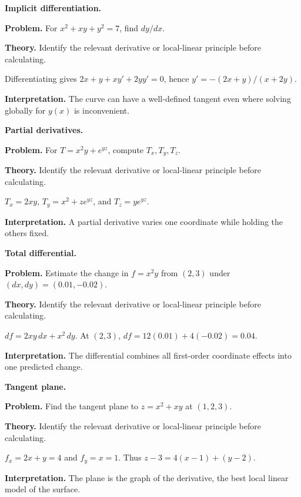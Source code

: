 \begin{workedexample}
\textbf{Implicit differentiation.}\par
\textbf{Problem.} For $x^2+xy+y^2=7$, find $dy/dx$.

\textbf{Theory.} Identify the relevant derivative or local-linear principle before calculating.

\begin{solution}
Differentiating gives $2x+y+x y'+2y y'=0$, hence $y'=-(2x+y)/(x+2y)$.

\textbf{Interpretation.} The curve can have a well-defined tangent even where solving globally for $y(x)$ is inconvenient.
\end{solution}
\end{workedexample}

\begin{workedexample}
\textbf{Partial derivatives.}\par
\textbf{Problem.} For $T=x^2y+e^{yz}$, compute $T_x,T_y,T_z$.

\textbf{Theory.} Identify the relevant derivative or local-linear principle before calculating.

\begin{solution}
$T_x=2xy$, $T_y=x^2+ze^{yz}$, and $T_z=ye^{yz}$.

\textbf{Interpretation.} A partial derivative varies one coordinate while holding the others fixed.
\end{solution}
\end{workedexample}

\begin{workedexample}
\textbf{Total differential.}\par
\textbf{Problem.} Estimate the change in $f=x^2y$ from $(2,3)$ under $(dx,dy)=(0.01,-0.02)$.

\textbf{Theory.} Identify the relevant derivative or local-linear principle before calculating.

\begin{solution}
$df=2xy\,dx+x^2\,dy$. At $(2,3)$, $df=12(0.01)+4(-0.02)=0.04$.

\textbf{Interpretation.} The differential combines all first-order coordinate effects into one predicted change.
\end{solution}
\end{workedexample}

\begin{workedexample}
\textbf{Tangent plane.}\par
\textbf{Problem.} Find the tangent plane to $z=x^2+xy$ at $(1,2,3)$.

\textbf{Theory.} Identify the relevant derivative or local-linear principle before calculating.

\begin{solution}
$f_x=2x+y=4$ and $f_y=x=1$. Thus $z-3=4(x-1)+(y-2)$.

\textbf{Interpretation.} The plane is the graph of the derivative, the best local linear model of the surface.
\end{solution}
\end{workedexample}

